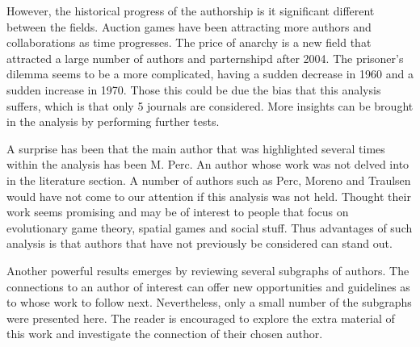\documentclass{article}
\begin{document}
However, the historical progress of the authorship is it significant different
between the fields. Auction games have been attracting more authors and collaborations
as time progresses. The price of anarchy is a new field that attracted a large
number of authors and parternshipd after 2004. The prisoner's dilemma seems to
be a more complicated, having a sudden decrease in 1960 and a sudden increase in
1970. Those this could be due the bias that this analysis suffers, which is that only
5 journals are considered. More insights can be brought in the analysis by performing
further tests.

A surprise has been that the main author that was highlighted several times
within the analysis has been M. Perc. An author whose work was not delved into
in the literature section. A number of authors such as Perc, Moreno and
Traulsen would have not come to our attention if this analysis was not held.
Thought their work seems promising and may be of interest to people that focus
on evolutionary game theory, spatial games and social stuff.
Thus advantages of such analysis is that authors that have not previously be
considered can stand out.

Another powerful results emerges by reviewing several subgraphs of authors.
The connections to an author of interest can offer new opportunities and guidelines
as to whose work to follow next. Nevertheless, only a small number
of the subgraphs were presented here. The reader is encouraged to explore
the extra material of this work and investigate the connection of their chosen
author.

\newpage


\end{document}
